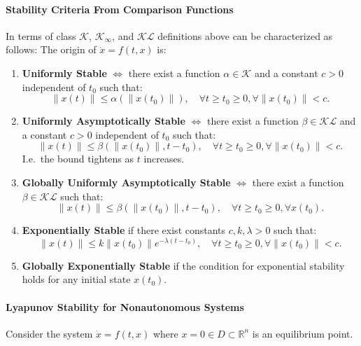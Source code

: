 \paragraph{Stability Criteria From Comparison Functions}
In terms of class $\mathcal{K}$, $\mathcal{K}_\infty$, and $\mathcal{K}\mathcal{L}$ definitions above can be characterized as follows: The origin of $\dot{x} = f(t, x)$ is:

\begin{enumerate}
    \item \textbf{Uniformly Stable} $\Leftrightarrow$ there exist a function $\alpha \in \mathcal{K}$ and a constant $c > 0$ independent of $t_0$ such that:
          \noindent\begin{equation*}
              \|x(t)\| \leq \alpha(\|x(t_0)\|), \quad \forall t \geq t_0 \geq 0, \forall \|x(t_0)\| < c.
          \end{equation*}
    \item \textbf{Uniformly Asymptotically Stable} $\Leftrightarrow$ there exist a function $\beta \in \mathcal{K}\mathcal{L}$ and a constant $c > 0$ independent of $t_0$ such that:
          \noindent\begin{equation*}
              \|x(t)\| \leq \beta(\|x(t_0)\|, t - t_0), \quad \forall t \geq t_0 \geq 0, \forall \|x(t_0)\| < c.
          \end{equation*}
          I.e.\ the bound tightens as $t$ increases.
    \item \textbf{Globally Uniformly Asymptotically Stable} $\Leftrightarrow$ there exist a function $\beta \in \mathcal{K}\mathcal{L}$ such that:
          \noindent\begin{equation*}
              \|x(t)\| \leq \beta(\|x(t_0)\|, t - t_0), \quad \forall t \geq t_0 \geq 0, \forall x(t_0).
          \end{equation*}
    \item \textbf{Exponentially Stable} if there exist constants $c, k, \lambda > 0$ such that:
          \noindent\begin{equation*}
              \|x(t)\| \leq k \|x(t_0)\| e^{-\lambda (t - t_0)}, \quad \forall t \geq t_0 \geq 0, \forall \|x(t_0)\| < c.
          \end{equation*}
    \item \textbf{Globally Exponentially Stable} if the condition for exponential stability holds for any initial state $x(t_0)$.
\end{enumerate}

\paragraph{Lyapunov Stability for Nonautonomous Systems}
Consider the system $\dot{x} = f(t, x)$ where $x = 0 \in D \subset \mathbb{R}^n$ is an equilibrium point.


